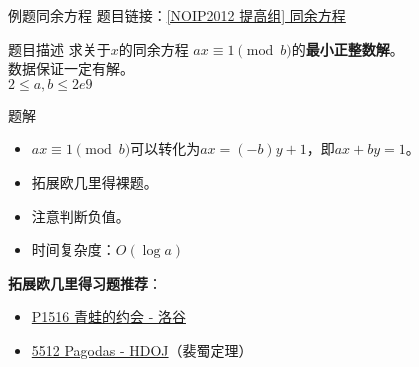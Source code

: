 \begin{frame}[fragile]{例题}{同余方程}
  题目链接：\href{https://www.luogu.com.cn/problem/P1082}{[NOIP2012 提高组] 同余方程}
  \begin{block}{题目描述}
    求关于$x$的同余方程 $ax \equiv 1 \pmod {b}$的\textbf{最小正整数解}。\\
    数据保证一定有解。\\
    $2 \leq a,b\leq 2e9$
  \end{block}
  \vspace{0.1cm}
  \pause

  \begin{exampleblock}{题解}
    \begin{itemize}
      \item $ax \equiv 1 \pmod {b}$可以转化为$ax=(-b)y+1$，即$ax+by=1$。
      \pause
      \item 拓展欧几里得裸题。
      \item 注意判断负值。
      \pause
      \item 时间复杂度：$O(\log{a})$
    \end{itemize}
  \end{exampleblock}
  \pause

  \textbf{拓展欧几里得习题推荐}：
  \begin{itemize}
    \item \href{https://www.luogu.com.cn/problem/P1516}{P1516 青蛙的约会 - 洛谷}
    \item \href{https://acm.dingbacode.com/showproblem.php?pid=5512}{5512 Pagodas - HDOJ}（裴蜀定理）
  \end{itemize}
\end{frame}
